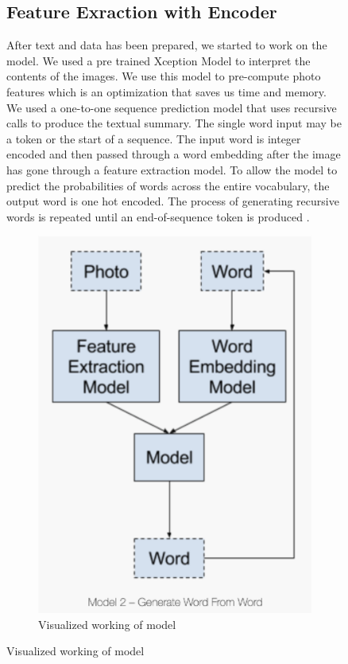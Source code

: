 \documentclass[conference]{IEEEtran}
\begin{document}
\begin{figure}[htbp]
\subsection{Feature Exraction with Encoder}
After text and data has been prepared, we started to work on the model. We used a pre trained Xception Model to interpret the contents of the images. We use this model to pre-compute photo features which is an optimization that saves us time and memory. We used a one-to-one sequence prediction model that uses recursive calls to produce the textual summary. The single word input may be a token or the start of a sequence. The input word is integer encoded and then passed through a word embedding after the image has gone through a feature extraction model. To allow the model to predict the probabilities of words across the entire vocabulary, the output word is one hot encoded. The process of generating recursive words is repeated until an end-of-sequence token is produced \cite {b13}. 

\begin{figure}[htbp]
\centerline{\includegraphics[width=\linewidth]{cnnmodel.png}}
\caption{Visualized working of model}
\label{fig7}
\end{figure}


\end{figure}
\end{document}
